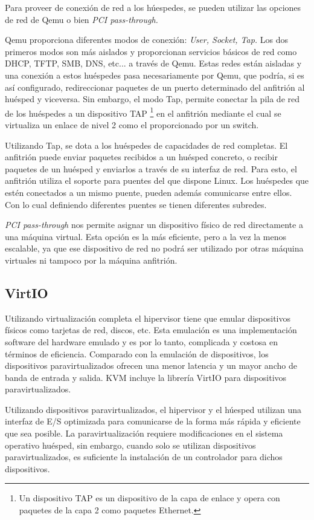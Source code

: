 \documentclass[spanisheDIVcalc,twoside,parskip-,pointlessnumbers,final]{scrbook}
\begin{document}
Para proveer de conexión de red a los húespedes, se pueden utilizar
las opciones de red de Qemu o bien \emph{PCI pass-through.}

Qemu proporciona diferentes modos de conexión: \emph{User, Socket,
Tap.} Los dos primeros modos son más aislados y proporcionan servicios
básicos de red como DHCP, TFTP, SMB, DNS, etc... a través de Qemu.
Estas redes están aisladas y una conexión a estos huéspedes pasa necesariamente
por Qemu, que podría, si es así configurado, redireccionar paquetes
de un puerto determinado del anfitrión al huésped y viceversa. Sin
embargo, el modo Tap, permite conectar la pila de red de los huéspedes
a un dispositivo TAP%
\footnote{Un dispositivo TAP es un dispositivo de la capa de enlace y opera
con paquetes de la capa 2 como paquetes Ethernet.%
} en el anfitrión mediante el cual se virtualiza un enlace de nivel
2 como el proporcionado por un switch.

Utilizando Tap, se dota a los huéspedes de capacidades de red completas.
El anfitrión puede enviar paquetes recibidos a un huésped concreto,
o recibir paquetes de un huésped y enviarlos a través de su interfaz
de red. Para esto, el anfitrión utiliza el soporte para puentes del
que dispone Linux. Los huéspedes que estén conectados a un mismo puente,
pueden además comunicarse entre ellos. Con lo cual definiendo diferentes
puentes se tienen diferentes subredes.

\emph{PCI pass-through }nos permite asignar un dispositivo físico
de red directamente a una máquina virtual. Esta opción es la más eficiente,
pero a la vez la menos escalable, ya que ese dispositivo de red no
podrá ser utilizado por otras máquina virtuales ni tampoco por la
máquina anfitrión.


\subsection{VirtIO}

Utilizando virtualización completa el hipervisor tiene que emular
dispositivos físicos como tarjetas de red, discos, etc. Esta emulación
es una implementación software del hardware emulado y es por lo tanto,
complicada y costosa en términos de eficiencia. Comparado con la emulación
de dispositivos, los dispositivos paravirtualizados ofrecen una menor
latencia y un mayor ancho de banda de entrada y salida. KVM incluye
la librería VirtIO para dispositivos paravirtualizados.

Utilizando dispositivos paravirtualizados, el hipervisor y el húesped
utilizan una interfaz de E/S optimizada para comunicarse de la forma
más rápida y eficiente que sea posible. La paravirtualización requiere
modificaciones en el sistema operativo huésped, sin embargo, cuando
solo se utilizan dispositivos paravirtualizados, es suficiente la
instalación de un controlador para dichos dispositivos. 
\end{document}
